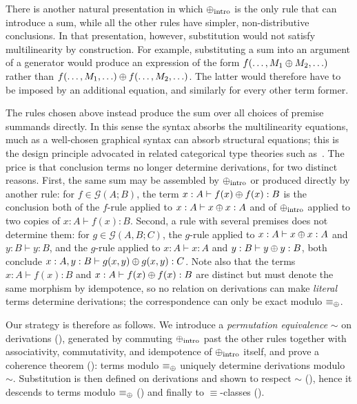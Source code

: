 \begin{remark}
\label{remark:distributive_rules}
There is another natural presentation in which $\mathbin{\oplus}_{\mathrm{intro}}$ is the
only rule that can introduce a sum, while all the other rules have simpler,
non-distributive conclusions.  In that presentation, however, substitution
would not satisfy multilinearity by construction.  For example, substituting
a sum into an argument of a generator would produce an expression of the form
$f(\ldots,M_1\mathbin{\oplus} M_2,\ldots)$ rather than
$f(\ldots,M_1,\ldots)\mathbin{\oplus} f(\ldots,M_2,\ldots)$.  The latter would therefore have
to be imposed by an additional equation, and similarly for every other term
former.

The rules chosen above instead produce the sum over all choices of premise
summands directly.  In this sense the syntax absorbs the multilinearity
equations, much as a well-chosen graphical syntax can absorb structural
equations; this is the design principle advocated in related categorical type
theories such as~\cite{shulman2016categorical}.  The price is that conclusion
terms no longer determine derivations, for two distinct reasons.
First, the same sum may be assembled by $\mathbin{\oplus}_{\mathrm{intro}}$ or produced
directly by another rule: for $f \in \mathcal{G}(A;B)$, the term
$x : A \vdash f(x) \mathbin{\oplus} f(x) : B$ is the conclusion both of the $f$-rule applied
to $x : A \vdash x \mathbin{\oplus} x : A$ and of $\mathbin{\oplus}_{\mathrm{intro}}$ applied to two copies
of $x : A \vdash f(x) : B$.
Second, a rule with several premises does not determine them: for
$g \in \mathcal{G}(A,B;C)$, the $g$-rule applied to $x : A \vdash x \mathbin{\oplus} x : A$
and $y : B \vdash y : B$, and the $g$-rule applied to $x : A \vdash x : A$
and $y : B \vdash y \mathbin{\oplus} y : B$, both conclude
$x : A, y : B \vdash g(x,y) \mathbin{\oplus} g(x,y) : C$.
Note also that the terms $x : A \vdash f(x) : B$ and
$x : A \vdash f(x) \mathbin{\oplus} f(x) : B$ are distinct but must denote the same morphism
by idempotence, so no relation on derivations can make \emph{literal} terms
determine derivations; the correspondence can only be exact modulo
$\equiv_{\mathbin{\oplus}}$.

Our strategy is therefore as follows.  We introduce a \emph{permutation
equivalence} $\sim$ on derivations (), generated by
commuting $\mathbin{\oplus}_{\mathrm{intro}}$ past the other rules together with
associativity, commutativity, and idempotence of $\mathbin{\oplus}_{\mathrm{intro}}$ itself,
and prove a coherence theorem (): terms modulo
$\equiv_{\mathbin{\oplus}}$ uniquely determine derivations modulo $\sim$.  Substitution is
then defined on derivations and shown to respect $\sim$
(), hence it descends to terms modulo
$\equiv_{\mathbin{\oplus}}$ () and finally to
$\equiv$-classes ().
\end{remark}

